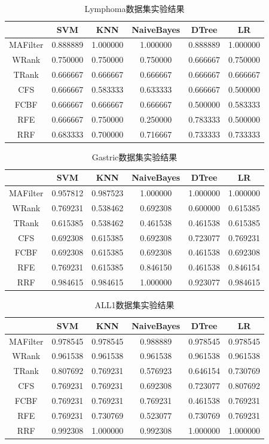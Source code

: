 \begin{table}        
\centering
\caption{Lymphoma数据集实验结果}
\begin{tabular}{cccccc}
\hline
  & SVM & KNN & NaiveBayes & DTree & LR\\
\hline
MAFilter&	0.888889&	1.000000	&1.000000	&0.888889&	1.000000\\
WRank	&0.750000&	0.750000	&0.750000	&0.666667	&0.750000\\
TRank&	0.666667	&0.666667&	0.666667	&0.666667&	0.666667\\
CFS&	0.666667	&0.583333	&0.633333&	0.666667&	0.500000\\
FCBF&	0.666667&	0.666667	&0.666667	&0.500000	&0.583333\\
RFE	&0.666667	&0.750000&	0.250000&	0.783333&	0.500000\\
RRF	&0.683333&	0.700000&	0.716667&	0.733333&	0.733333\\
\hline
\end{tabular}
\end{table}


\begin{table}        
\centering
\caption{Gastric数据集实验结果}
\begin{tabular}{cccccc}
\hline
  & SVM & KNN & NaiveBayes & DTree & LR\\
\hline
MAFilter&	0.957812&	0.987523&	1.000000&	1.000000&	1.000000\\
WRank	&0.769231&	0.538462&	0.692308&	0.600000	&0.615385\\
TRank	&0.615385&	0.538462&	0.461538&	0.461538&	0.615385\\
CFS	&0.692308&	0.615385&	0.692308&	0.723077	&0.769231\\
FCBF&	0.692308&	0.615385&	0.692308&	0.461538&	0.692308\\
RFE&	0.769231&	0.615385&	0.846150&	0.461538&	0.846154\\
RRF&	0.984615&	0.984615&	1.000000&	0.923077&	0.984615\\
\hline
\end{tabular}
\end{table}

\begin{table}        
\centering
\caption{ALL1数据集实验结果}
\begin{tabular}{cccccc}
\hline
  & SVM & KNN & NaiveBayes & DTree & LR\\
\hline
MAFilter&	0.978545&	0.978545&	0.988889&	0.978545&	0.978545\\
WRank	&0.961538&	0.961538&	0.961538&	0.961538&	0.961538\\
TRank	&0.807692&	0.769231&	0.576923&	0.646154&	0.730769\\
CFS	&0.769231	&0.769231&	0.692308	&0.723077&	0.807692\\
FCBF&	0.769231&	0.769231&	0.769231&	0.461538&	0.769231\\
RFE&	0.769231&	0.730769&	0.523077&	0.730769&	0.769231\\
RRF&	0.992308&	1.000000&	0.992308&	1.000000&	1.000000\\
\hline
\end{tabular}
\end{table}

